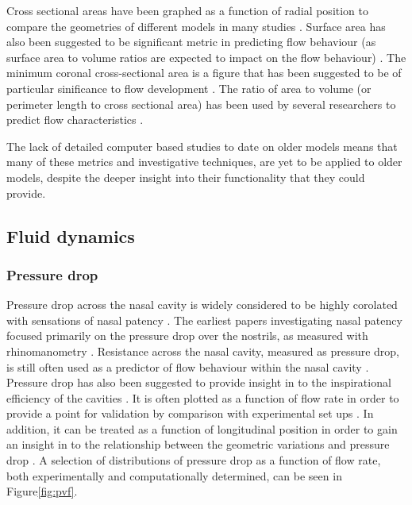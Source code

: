 Cross sectional areas have been graphed as a function of radial position to compare the geometries of different models in many studies \cite{Xi2012, Zhu2011, Lindemann2008, Garcia2007}. Surface area has also been suggested to be significant metric in predicting flow behaviour (as surface area to volume ratios are expected to impact on the flow behaviour) \cite{Xi2012, Garcia2007}. The minimum coronal cross-sectional area is a figure that has been suggested to be of particular sinificance to flow development \cite{Lindemann2008}. The ratio of area to volume (or perimeter length to cross sectional area) has been used by several researchers to predict flow characteristics \cite{Xi2012, Garcia2007}.

The lack of detailed computer based studies to date on older models means that many of these metrics and investigative techniques, are yet to be applied to older models, despite the deeper insight into their functionality that they could provide.

\subsection{Fluid dynamics}


\subsubsection{Pressure drop}

Pressure drop across the nasal cavity is widely considered to be highly corolated with sensations of nasal patency \cite{Ottaviano2016}.
The earliest papers investigating nasal patency focused primarily on the pressure drop over the nostrils, as measured with rhinomanometry \cite{Martin1981}. 
Resistance across the nasal cavity, measured as pressure drop, is still often used as a predictor of flow behaviour within the nasal cavity \cite{Edelstein1996, Lindemann2008, WhanKim2007}. 
Pressure drop has also been suggested to provide insight in to the inspirational efficiency of the cavities \cite{Lintermann2013}. 
It is often plotted as a function of flow rate in order to provide a point for validation by comparison with experimental set ups \cite{Wen2008, Inthavong2014}. 
In addition, it can be treated as a function of longitudinal position in order to gain an insight in to the relationship between the geometric variations and pressure drop \cite{Lintermann2013}. 
A selection of distributions of pressure drop as a function of flow rate, both experimentally and computationally determined, can be seen in Figure\ref{fig:pvf}. 


